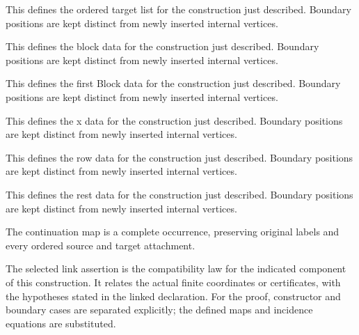This defines the ordered target list for the construction just described. Boundary positions are kept distinct from newly inserted internal vertices.
\par{}

This defines the block data for the construction just described. Boundary positions are kept distinct from newly inserted internal vertices.
\par{}

This defines the first Block data for the construction just described. Boundary positions are kept distinct from newly inserted internal vertices.
\par{}

This defines the x data for the construction just described. Boundary positions are kept distinct from newly inserted internal vertices.
\par{}

This defines the row data for the construction just described. Boundary positions are kept distinct from newly inserted internal vertices.
\par{}

This defines the rest data for the construction just described. Boundary positions are kept distinct from newly inserted internal vertices.
\par{}

The continuation map is a complete occurrence, preserving original labels and every ordered source and target attachment.
\par{}

The selected link assertion is the compatibility law for the indicated component of this construction. It relates the actual finite coordinates or certificates, with the hypotheses stated in the linked declaration.
For the proof, constructor and boundary cases are separated explicitly; the defined maps and incidence equations are substituted.
\par{}

